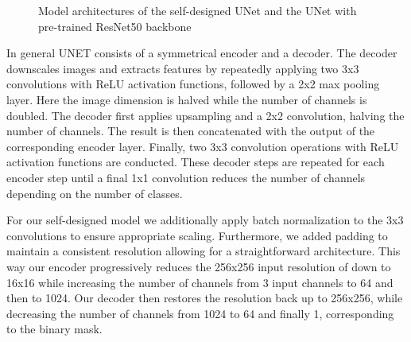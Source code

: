 \documentclass[lettersize,journal]{IEEEtran}
\begin{document}
\begin{figure}[h]
  \centering
   \quad
  \caption{Model architectures of the self-designed UNet and the UNet with pre-trained ResNet50 backbone}
  \label{fig:models}
\end{figure}
 
In general UNET consists of a symmetrical encoder and a decoder. The decoder downscales images and extracts features by repeatedly applying two 3x3 convolutions with ReLU activation functions, followed by a 2x2 max pooling layer. Here the image dimension is halved while the number of channels is doubled. The decoder first applies upsampling and a 2x2 convolution, halving the number of channels. The result is then concatenated with the output of the corresponding encoder layer. Finally, two 3x3 convolution operations with ReLU activation functions are conducted. These decoder steps are repeated for each encoder step until a final 1x1 convolution reduces the number of channels depending on the number of classes.
 
For our self-designed model we additionally apply batch normalization to the 3x3 convolutions to ensure appropriate scaling. Furthermore, we added padding to maintain a consistent resolution allowing for a straightforward architecture. This way our encoder progressively reduces the 256x256 input resolution of down to 16x16 while increasing the number of channels from 3 input channels to 64 and then to 1024. Our decoder then restores the resolution back up to 256x256, while decreasing the number of channels from 1024 to 64 and finally 1, corresponding to the binary mask.
\end{document}
